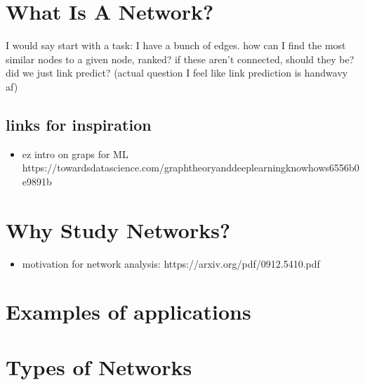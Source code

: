 \documentclass[letterpaper,10pt,english]{jupyterBook}
\begin{document}
\section{What Is A Network?}
\label{\detokenize{foundations/ch1/what-is-a-network:what-is-a-network}}\label{\detokenize{foundations/ch1/what-is-a-network::doc}}
\sphinxAtStartPar
I would say start with a task: I have a bunch of edges.
how can I find the most similar nodes to a given node, ranked?
if these aren’t connected, should they be?  did we just link predict? (actual question I feel like link prediction is handwavy af)


\subsection{links for inspiration}
\label{\detokenize{foundations/ch1/what-is-a-network:links-for-inspiration}}\begin{itemize}
\item {} 
\sphinxAtStartPar
ez intro on graps for ML https://towardsdatascience.com/graph\sphinxhyphen{}theory\sphinxhyphen{}and\sphinxhyphen{}deep\sphinxhyphen{}learning\sphinxhyphen{}know\sphinxhyphen{}hows\sphinxhyphen{}6556b0e9891b

\end{itemize}


\section{Why Study Networks?}
\label{\detokenize{foundations/ch1/why-study-networks:why-study-networks}}\label{\detokenize{foundations/ch1/why-study-networks::doc}}\begin{itemize}
\item {} 
\sphinxAtStartPar
motivation for network analysis: https://arxiv.org/pdf/0912.5410.pdf

\end{itemize}


\section{Examples of applications}
\label{\detokenize{foundations/ch1/examples-of-applications:examples-of-applications}}\label{\detokenize{foundations/ch1/examples-of-applications::doc}}

\section{Types of Networks}
\label{\detokenize{foundations/ch1/types-of-networks:types-of-networks}}\label{\detokenize{foundations/ch1/types-of-networks::doc}}
\end{document}
